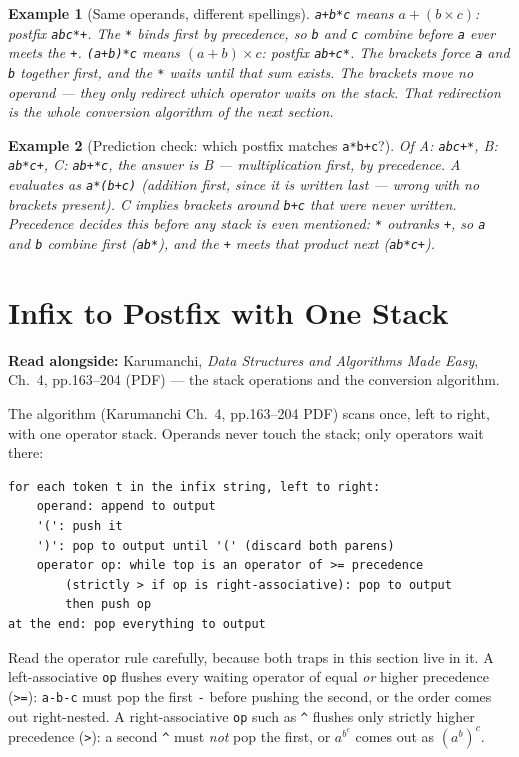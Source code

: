 \documentclass[11pt]{article}
\newtheorem{example}{Example}[section]
\begin{document}
\begin{example}[Same operands, different spellings]
\texttt{a+b*c} means $a + (b \times c)$: postfix \texttt{abc*+}. The \texttt{*} binds first by precedence, so \texttt{b} and \texttt{c} combine before \texttt{a} ever meets the \texttt{+}. \texttt{(a+b)*c} means $(a + b) \times c$: postfix \texttt{ab+c*}. The brackets force \texttt{a} and \texttt{b} together first, and the \texttt{*} waits until that sum exists. The brackets move no operand --- they only redirect which operator waits on the stack. That redirection is the whole conversion algorithm of the next section. 
\end{example}

\begin{example}[Prediction check: which postfix matches \texttt{a*b+c}?]
Of A: \texttt{abc+*}, B: \texttt{ab*c+}, C: \texttt{ab+*c}, the answer is B --- multiplication first, by precedence. A evaluates as \texttt{a*(b+c)} (addition first, since it is written last --- wrong with no brackets present). C implies brackets around \texttt{b+c} that were never written. Precedence decides this before any stack is even mentioned: \texttt{*} outranks \texttt{+}, so \texttt{a} and \texttt{b} combine first (\texttt{ab*}), and the \texttt{+} meets that product next (\texttt{ab*c+}).
\end{example}

\section{Infix to Postfix with One Stack}

\textbf{Read alongside:} Karumanchi, \textit{Data Structures and Algorithms Made Easy}, Ch.~4, pp.163--204 (PDF) --- the stack operations and the conversion algorithm.

The algorithm (Karumanchi Ch.~4, pp.163--204 PDF) \cite{Karumanchi2017_data_structures_algorithms_made_easy} scans once, left to right, with one operator stack. Operands never touch the stack; only operators wait there:
{\footnotesize
\begin{verbatim}
for each token t in the infix string, left to right:
    operand: append to output
    '(': push it
    ')': pop to output until '(' (discard both parens)
    operator op: while top is an operator of >= precedence
        (strictly > if op is right-associative): pop to output
        then push op
at the end: pop everything to output
\end{verbatim}
}
Read the operator rule carefully, because both traps in this section live in it. A left-associative \texttt{op} flushes every waiting operator of equal \emph{or} higher precedence (\texttt{>=}): \texttt{a-b-c} must pop the first \texttt{-} before pushing the second, or the order comes out right-nested. A right-associative \texttt{op} such as \texttt{\^{}} flushes only strictly higher precedence (\texttt{>}): a second \texttt{\^{}} must \emph{not} pop the first, or $a^{b^{c}}$ comes out as $(a^{b})^{c}$.
\end{document}
